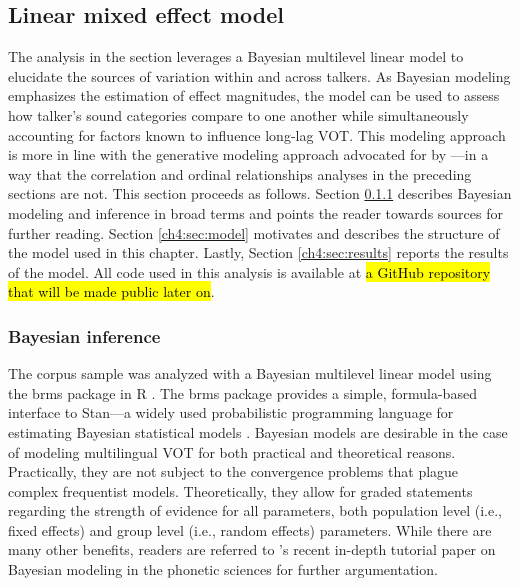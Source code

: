 \subsection{Linear mixed effect model}\label{ch4:sec:lmem}

The analysis in the section leverages a Bayesian multilevel linear model to elucidate the sources of variation within and across talkers. As Bayesian modeling emphasizes the estimation of effect magnitudes, the model can be used to assess how talker's sound categories compare to one another while simultaneously accounting for factors known to influence long-lag VOT. This modeling approach is more in line with the generative modeling approach advocated for by \citet{haines_2020_theoretically}---in a way that the correlation and ordinal relationships analyses in the preceding sections are not. This section proceeds as follows. Section \ref{ch4:sec:bayesianinference} describes Bayesian modeling and inference in broad terms and points the reader towards sources for further reading. Section \ref{ch4:sec:model} motivates and describes the structure of the model used in this chapter. Lastly, Section \ref{ch4:sec:results} reports the results of the model. All code used in this analysis is available at \hl{a GitHub repository that will be made public later on}.

\subsubsection{Bayesian inference}\label{ch4:sec:bayesianinference}
The corpus sample was analyzed with a Bayesian multilevel linear model using the brms package in R \citep{burkner_2017_brms,r_2021}. The brms package provides a simple, formula-based interface to Stan---a widely used probabilistic programming language for estimating Bayesian statistical models \citep{stan_2021}. Bayesian models are desirable in the case of modeling multilingual VOT for both practical and theoretical reasons. Practically, they are not subject to the convergence problems that plague complex frequentist models. Theoretically, they allow for graded statements regarding the strength of evidence for all parameters, both population level (i.e., fixed effects) and group level (i.e., random effects) parameters. While there are many other benefits, readers are referred to \citeauthor{vasishth_2018_bayesian}'s \citeyearpar{vasishth_2018_bayesian} recent in-depth tutorial paper on Bayesian modeling in the phonetic sciences for further argumentation. 

